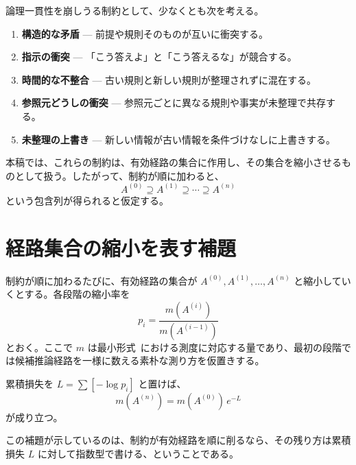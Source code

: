 \documentclass[12pt,a4paper]{article}
\begin{document}
論理一貫性を崩しうる制約として、少なくとも次を考える。

\begin{enumerate}
  \item \textbf{構造的な矛盾} --- 前提や規則そのものが互いに衝突する。
  \item \textbf{指示の衝突} --- 「こう答えよ」と「こう答えるな」が競合する。
  \item \textbf{時間的な不整合} --- 古い規則と新しい規則が整理されずに混在する。
  \item \textbf{参照元どうしの衝突} --- 参照元ごとに異なる規則や事実が未整理で共存する。
  \item \textbf{未整理の上書き} --- 新しい情報が古い情報を条件づけなしに上書きする。
\end{enumerate}

本稿では、これらの制約は、有効経路の集合に作用し、その集合を縮小させるものとして扱う。したがって、制約が順に加わると、
\begin{equation}\label{eq:path-chain}
A^{(0)} \supseteq A^{(1)} \supseteq \cdots \supseteq A^{(n)}
\end{equation}
という包含列が得られると仮定する。

\section{経路集合の縮小を表す補題}

制約が順に加わるたびに、有効経路の集合が $A^{(0)}, A^{(1)}, \ldots, A^{(n)}$ と縮小していくとする。各段階の縮小率を
\begin{equation*}
p_i = \frac{m(A^{(i)})}{m(A^{(i-1)})}
\end{equation*}
とおく。ここで $m$ は最小形式~\cite{paper1}における測度に対応する量であり、最初の段階では候補推論経路を一様に数える素朴な測り方を仮置きする。

\begin{lemma}\label{lem:path-exp}
累積損失を $L = \sum[-\log p_i]$ と置けば、
\begin{equation}\label{eq:path-exp}
m(A^{(n)}) = m(A^{(0)})\, e^{-L}
\end{equation}
が成り立つ。
\end{lemma}

この補題が示しているのは、制約が有効経路を順に削るなら、その残り方は累積損失 $L$ に対して指数型で書ける、ということである。
\end{document}
